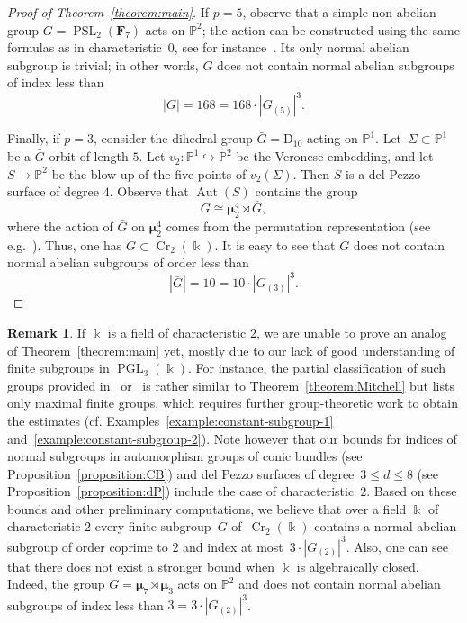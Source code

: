 \documentclass[12pt]{amsart}
\numberwithin{equation}{section}
\theoremstyle{definition}
\newtheorem{remark}[subsection]{Remark}
\newcommand{\mumu}{\boldsymbol{\mu}}
\newcommand{\PP}{\mathbb P}
\newcommand{\DD}{\mathrm D}
\DeclareMathOperator{\Cr}{Cr}
\DeclareMathOperator{\Aut}{Aut}
\DeclareMathOperator{\PGL}{PGL}
\DeclareMathOperator{\PSL}{PSL}
\def \le {\leqslant}
\begin{document}
\begin{proof}[Proof of Theorem~\ref{theorem:main}]
If $p=5$, observe that a simple non-abelian
group $G=\PSL_2(\mathbf{F}_7)$ acts on $\PP^2$; the action can be constructed using the same formulas as in characteristic~$0$, see for instance~\mbox{\cite[\S6.5.3]{Dolgachev}}.
Its only normal abelian subgroup is trivial; in other words, $G$ does not contain
normal abelian subgroups of index less than
$$
|G|=168=168\cdot |G_{(5)}|^3.
$$

Finally, if $p=3$, consider the dihedral group $\bar{G}=\DD_{10}$ acting on $\PP^1$.
Let~\mbox{$\Sigma\subset\PP^1$} be a $\bar{G}$-orbit of length $5$. Let
$v_2\colon \PP^1\hookrightarrow\PP^2$ be the Veronese embedding,
and let~\mbox{$S\to \PP^2$} be the blow up of the five points
of $v_2(\Sigma)$. Then $S$ is a del Pezzo surface of degree $4$. Observe that $\Aut(S)$ contains
the group
$$
G\cong\mumu_2^4\rtimes \bar{G},
$$
where the action of $\bar{G}$ on $\mumu_2^4$ comes from
the permutation representation (see e.g.~\mbox{\cite[\S3]{DD}}).
Thus, one has $G\subset\Cr_2(\Bbbk)$.
It is easy to see that $G$ does not contain normal abelian subgroups of
order less than
$$
|\bar{G}|=10=10\cdot |G_{(3)}|^3.
$$
\end{proof}


\begin{remark}\label{remark:future}
If $\Bbbk$ is a field of characteristic $2$, we are unable to prove
an analog of Theorem~\ref{theorem:main} yet, mostly due to our lack of
good understanding of finite subgroups in $\PGL_3(\Bbbk)$. For instance, the partial
classification of such groups provided in~\cite{Hartley} or~\mbox{\cite[Theorem~2.7]{King}}
is rather similar to Theorem~\ref{theorem:Mitchell} but lists only maximal finite groups,
which requires further group-theoretic work to obtain the estimates
(cf. Examples~\ref{example:constant-subgroup-1}
and~\ref{example:constant-subgroup-2}).
Note however that our bounds for indices of normal subgroups
in automorphism groups of conic bundles
(see Proposition~\ref{proposition:CB}) and
del Pezzo surfaces of degree~\mbox{$3\le d\le 8$}
(see Proposition~\ref{proposition:dP})
include the case of characteristic~$2$.
Based on these bounds and other preliminary computations,
we believe that over a field $\Bbbk$ of characteristic $2$
every finite subgroup~$G$ of~\mbox{$\Cr_2(\Bbbk)$}
contains a normal abelian subgroup of order coprime
to $2$ and index at most~\mbox{$3\cdot |G_{(2)}|^{3}$}.
Also, one can see that there does not exist a stronger bound
when $\Bbbk$ is algebraically closed.
Indeed, the group $G=\mumu_7\rtimes\mumu_3$ acts on $\PP^2$
and does not contain normal abelian subgroups of index
less than $3=3\cdot |G_{(2)}|^3$.
\end{remark}
\end{document}
